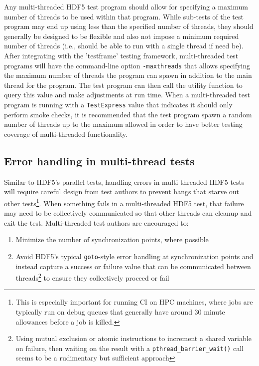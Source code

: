 \documentclass[../HDF5_RFC.tex]{subfiles}
\begin{document}
Any multi-threaded HDF5 test program should allow for specifying a maximum number of threads to be
used within that program. While sub-tests of the test program may end up using less than the specified
number of threads, they should generally be designed to be flexible and also not impose a minimum
required number of threads (i.e., should be able to run with a single thread if need be). After integrating
with the 'testframe' testing framework, multi-threaded test programs will have the command-line option
\texttt{-maxthreads} that allows specifying the maximum number of threads the program can spawn in addition
to the main thread for the program. The test program can then call the  utility function to query this value and make adjustments at
run time. When a multi-threaded test program is running with a \texttt{TestExpress} value that indicates it should only perform smoke checks, it is recommended that the test program spawn a random number of threads
up to the maximum allowed in order to have better testing coverage of multi-threaded functionality.

\subsection{Error handling in multi-thread tests}

Similar to HDF5's parallel tests, handling errors in multi-threaded HDF5 tests will require careful design
from test authors to prevent hangs that starve out other tests\footnote{This is especially important for running CI on HPC machines, where jobs are typically run on debug queues that generally have around 30
minute allowances before a job is killed.}. When something fails in a multi-threaded HDF5 test, that
failure may need to be collectively communicated so that other threads can cleanup and exit the test.
Multi-threaded test authors are encouraged to:

\begin{enumerate}

    \item Minimize the number of synchronization points, where possible
    \item Avoid HDF5's typical \texttt{goto}-style error handling at synchronization points and instead
          capture a success or failure value that can be communicated between threads\footnote{Using
          mutual exclusion or atomic instructions to increment a shared variable on failure, then waiting
          on the result with a \texttt{pthread\_barrier\_wait()} call seems to be a rudimentary but
          sufficient approach} to ensure they collectively proceed or fail

\end{enumerate}
\end{document}
